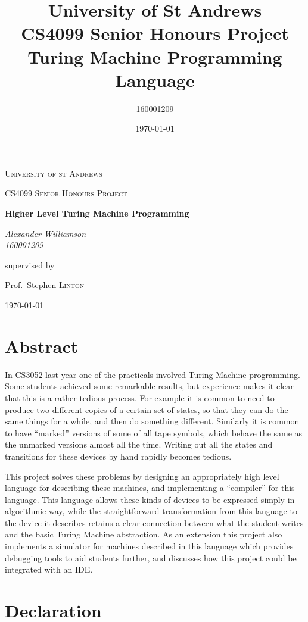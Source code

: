 \documentclass[11pt]{article}
\title{%
    University of St Andrews \\
    \large CS4099 Senior Honours Project \\
    Turing Machine Programming Language
}
\author{160001209}
\date{\today}
\begin{document}
\begin{titlepage}
	\centering
	{\scshape\LARGE University of st Andrews \par}
	\vspace{1cm}
	{\scshape\Large CS4099 Senior Honours Project\par}
	\vspace{1.5cm}
	{\huge\bfseries Higher Level Turing Machine Programming\par}
	\vspace{2cm}
	{\Large\itshape Alexander Williamson\\160001209\par}
	\vfill
	supervised by\par
	Prof.~Stephen \textsc{Linton}

	\vfill

	{\large \today\par}
\end{titlepage}

\section{Abstract}

In CS3052 last year one of the practicals involved Turing Machine programming. Some students achieved some remarkable results, but experience makes it clear that this is a rather tedious process. For example it is common to need to produce two different copies of a certain set of states, so that they can do the same things for a while, and then do something different. Similarly it is common to have “marked” versions of some of all tape symbols, which behave the same as the unmarked versions almost all the time. Writing out all the states and transitions for these devices by hand rapidly becomes tedious.

This project solves these problems by designing an appropriately high level language for describing these machines, and implementing a “compiler” for this language. This language allows these kinds of devices to be expressed simply in algorithmic way, while the straightforward transformation from this language to the device it describes retains a clear connection between what the student writes and the basic Turing Machine abstraction. As an extension this project also implements a simulator for machines described in this language which provides debugging tools to aid students further, and discusses how this project could be integrated with an IDE.

\section{Declaration}
\end{document}
